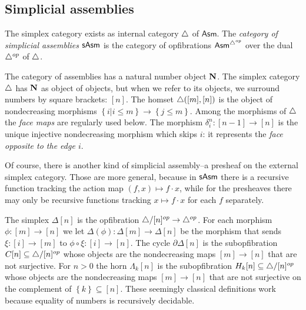 \documentclass{amsart}
\theoremstyle{plain}
\theoremstyle{definition}
\newcommand\set[1]{\left\{#1\right\}}
\newcommand\Asm{\mathsf{Asm}}
\begin{document}
\subsection{Simplicial assemblies}
The simplex category exists as internal category ${\mathord{\triangle}}$ of $\Asm$. The \emph{category of simplicial assemblies} $\mathsf{sAsm}$ is the category of opfibrations $\Asm^{\simcat\dual}$ over the dual ${\mathord{\triangle}}^{op}$ of ${\mathord{\triangle}}$.

The category of assemblies has a natural number object $\mathbf N$. The simplex category ${\mathord{\triangle}}$ has $\mathbf N$ as object of objects, but when we refer to its objects, we surround numbers by square brackets: $[n]$. The homset ${\mathord{\triangle}}([m],[n])$ is the object of nondecreasing morphisms $\set{i|i\leq m}\to\set{j\leq m}$. Among the morphisms of ${\mathord{\triangle}}$ the \emph{face maps} are regularly used below. The morphism $\delta^n_i:[n-1]\to [n]$ is the unique injective nondecreasing morphism which skips $i$: it represents the \emph{face opposite to the edge $i$}.

Of course, there is another kind of simplicial assembly--a presheaf on the external simplex category. Those are more general, because in $\mathsf{sAsm}$ there is a recursive function tracking the action map $(f,x)\mapsto f\cdot x$, while for the presheaves there may only be recursive functions tracking $x\mapsto f\cdot x$ for each $f$ separately.

The simplex $\Delta[n]$ is the opfibration ${\mathord{\triangle}}/[n]^{op}\to{\mathord{\triangle}}^{op}$. For each morphism $\phi:[m]\to[n]$ we let $\Delta(\phi):\Delta[m] \to \Delta[n]$ be the morphism that sends $\xi:[i]\to [m]$ to $\phi\circ \xi:[i]\to [n]$. The cycle $\partial\Delta[n]$ is the subopfibration $C[n]\subseteq {\mathord{\triangle}}/[n]^{op}$ whose objects are the nondecreasing maps $[m]\to[n]$ that are not surjective. For $n>0$ the horn $\Lambda_k[n]$ is the subopfibration $H_k[n]\subseteq{\mathord{\triangle}}/[n]^{op}$ whose objects are the nondecreasing maps $[m]\to[n]$ that are not surjective on the complement of $\set k\subseteq[n]$. These seemingly classical definitions work because equality of numbers is recursively decidable.
\end{document}
